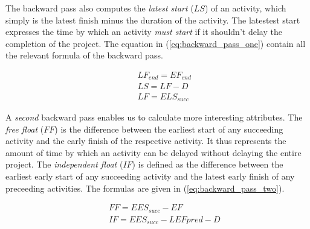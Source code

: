 The backward pass also computes the \emph{latest start} ($LS$) of an activity, which simply is the
latest finish minus the duration of the activity. The latestest start expresses the time by which an
activity \emph{must start} if it shouldn't delay the completion of the project. The equation in
(\ref{eq:backward_pass_one}) contain all the relevant formula of the backward pass.

\begin{eqnarray}
&& LF_{end}=EF_{end} \nonumber\\
&& LS=LF-D \nonumber\\
&& LF=ELS_{succ}
\label{eq:backward_pass_one}
\end{eqnarray}

A \emph{second} backward pass enables us to calculate more interesting attributes. The \emph{free
float} ($FF$) is the difference between the earliest start of any succeeding activity and the early
finish of the respective activity. It thus represents the amount of time by which an activity can be
delayed without delaying the entire project.  The \emph{independent float} ($IF$) is defined as the
difference between the earliest early start of any succeeding activity and the latest early finish 
of any preceeding activities. The formulas are given in (\ref{eq:backward_pass_two}).

\begin{eqnarray}
&& FF=EES_{succ}-EF \nonumber\\
&& IF=EES_{succ}-LEF{pred}-D \\
\label{eq:backward_pass_two}
\end{eqnarray}


%
